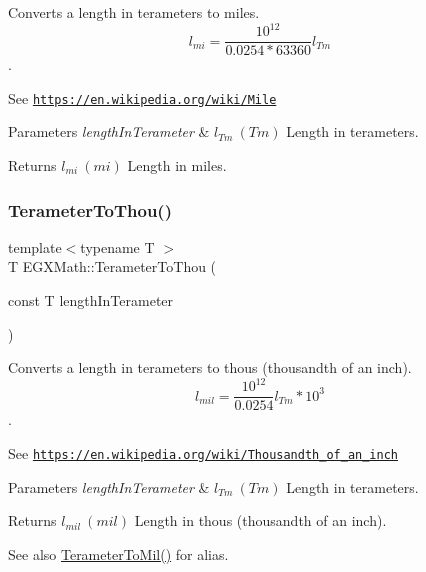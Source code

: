 Converts a length in terameters to miles. \[ l_{mi}=\frac{10^{12}}{0.0254 * 63360} l_{Tm} \]. 

See \href{https://en.wikipedia.org/wiki/Mile}{\tt https\+://en.\+wikipedia.\+org/wiki/\+Mile} 
\begin{DoxyParams}{Parameters}
{\em length\+In\+Terameter} & $ l_{Tm}\ (Tm)$ Length in terameters. \\
\hline
\end{DoxyParams}
\begin{DoxyReturn}{Returns}
$ l_{mi}\ (mi)$ Length in miles. 
\end{DoxyReturn}
\mbox{\label{group___e_g_x_math-_conversions-_length_conversions-_terameter-_imperial_ga3e00f52eb5c96d53031f36d7003a0e5e}} 
\subsubsection{\texorpdfstring{Terameter\+To\+Thou()}{TerameterToThou()}}
{\footnotesize\ttfamily template$<$typename T $>$ \\
T E\+G\+X\+Math\+::\+Terameter\+To\+Thou (\begin{DoxyParamCaption}\item[{const T}]{length\+In\+Terameter }\end{DoxyParamCaption})}



Converts a length in terameters to thous (thousandth of an inch). \[ l_{mil}= \frac{10^{12}}{0.0254} l_{Tm} * 10^{3} \]. 

See \href{https://en.wikipedia.org/wiki/Thousandth_of_an_inch}{\tt https\+://en.\+wikipedia.\+org/wiki/\+Thousandth\+\_\+of\+\_\+an\+\_\+inch} 
\begin{DoxyParams}{Parameters}
{\em length\+In\+Terameter} & $ l_{Tm}\ (Tm)$ Length in terameters. \\
\hline
\end{DoxyParams}
\begin{DoxyReturn}{Returns}
$ l_{mil}\ (mil)$ Length in thous (thousandth of an inch). 
\end{DoxyReturn}
\begin{DoxySeeAlso}{See also}
\mbox{\hyperlink{group___e_g_x_math-_conversions-_length_conversions-_terameter-_imperial_ga9ae6fa58a9800d91e89f76e68838fa86}{Terameter\+To\+Mil()}} for alias. 
\end{DoxySeeAlso}
\mbox{\label{group___e_g_x_math-_conversions-_length_conversions-_terameter-_imperial_ga4f3bcac82e02fddb21fedf80ec01275b}} 
